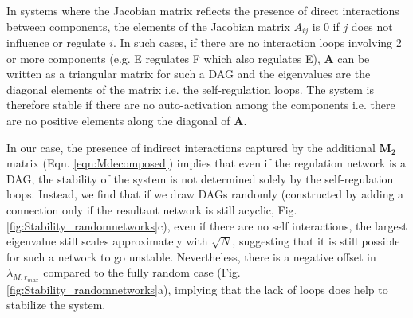 \documentclass[10pt]{article}
\begin{document}
In systems where the Jacobian matrix reflects the presence of direct interactions between components, the elements of the Jacobian matrix $A_{ij}$ is 0 if $j$ does not influence or regulate $i$. In such cases, if there are no interaction loops involving 2 or more components (e.g. E regulates F which also regulates E), $\mathbf{A}$ can be written as a triangular matrix for such a DAG and the eigenvalues are the diagonal elements of the matrix i.e. the self-regulation loops. The system is therefore stable if there are no auto-activation among the components i.e. there are no positive elements along the diagonal of $\mathbf{A}$.

In our case, the presence of indirect interactions captured by the additional $\mathbf{M_2}$ matrix (Eqn. \ref{eqn:Mdecomposed}) implies that even if the regulation network is a DAG, the stability of the system is not determined solely by the self-regulation loops. Instead, we find that if we draw DAGs randomly (constructed by adding a connection only if the resultant network is still acyclic, Fig.\ref{fig:Stability_randomnetworks}c), even if there are no self interactions, the largest eigenvalue still scales approximately with $\sqrt{N}$, suggesting that it is still possible for such a network to go unstable. Nevertheless, there is a negative offset in $\lambda_{M,r_{max}}$ compared to the fully random case (Fig. \ref{fig:Stability_randomnetworks}a), implying that the lack of loops does help to stabilize the system.

\end{document}
